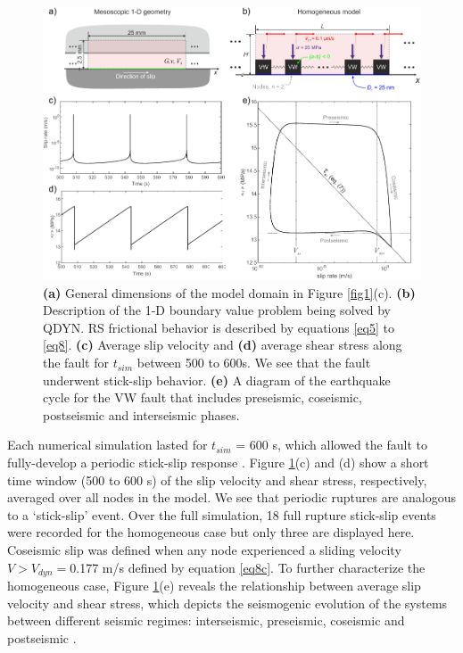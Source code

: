 \documentclass[preprint,1p, 10pt,authoryear]{elsarticle}
\begin{document}
\begin{figure}
	\centering
	\includegraphics{FIG5_revised.pdf} 
	\caption{\textbf{(a)} General dimensions of the model domain in Figure \ref{fig1}(c). \textbf{(b)} Description of the 1-D boundary value problem being solved by QDYN.  RS frictional behavior is described by equations \eqref{eq5} to \eqref{eq8}. \textbf{(c)} Average slip velocity and \textbf{(d)} average shear stress along the fault for $t_{sim}$ between 500 to 600s. We see that the fault underwent stick-slip behavior. \textbf{(e)} A diagram of the earthquake cycle for the VW fault that includes preseismic, coseismic, postseismic and interseismic phases.}
	\label{fig5}
\end{figure}

Each numerical simulation lasted for $t_{sim}$ = 600 s, which allowed the fault to fully-develop a periodic stick-slip response \citep{Hillers2007}.  Figure \ref{fig5}(c) and (d) show a short time window (500 to 600 s) of the slip velocity and shear stress, respectively, averaged over all nodes in the model.  We see that periodic ruptures are analogous to a `stick-slip' event. Over the full simulation, 18 full rupture stick-slip events were recorded for the homogeneous case but only three are displayed here.  Coseismic slip was defined when any node experienced a sliding velocity $V > V_{dyn}=$0.177 m/s defined by equation \eqref{eq8c}. To further characterize the homogeneous case, Figure \ref{fig5}(e) reveals the relationship between average slip velocity and shear stress, which depicts the seismogenic evolution of the systems between different seismic regimes: interseismic, preseismic, coseismic and postseismic \citep{Ampuero2008}.
\end{document}
